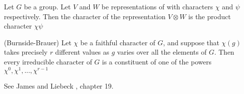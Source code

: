 \begin{proposition}
    Let $G$ be a group. Let $V$ and $W$ be representations of with characters $\chi$ and $\psi$ respectively. Then 
    the character of the representation $V \otimes W$ is the product character $\chi\psi$
\end{proposition}


\begin{theorem}\label{thm:Burnside_Brauer}(Burnside-Brauer)
    Let $\chi$ be a faithful character of $G$, and suppose that $\chi(g)$ takes precisely $r$ different values as 
    $g$ varies over all the elements of $G$. Then every irreducible character of $G$ is a constituent of one of the 
    powers $\chi^0, \chi^1, ... , \chi^{r-1}$
\end{theorem}
See James and Liebeck \cite{James&Liebeck}, chapter 19.

